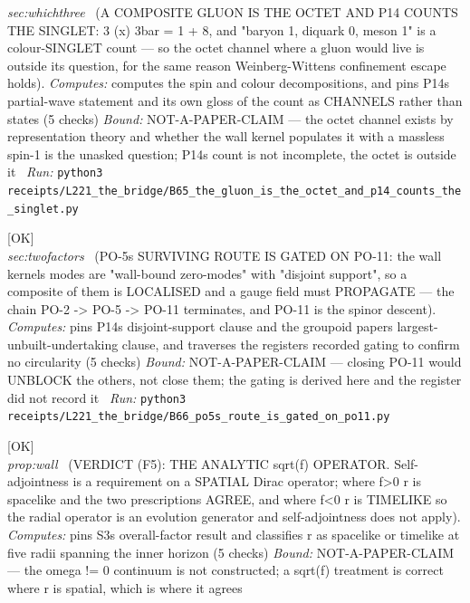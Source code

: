 \begin{description}
\textit{sec:whichthree} \ (A COMPOSITE GLUON IS THE OCTET AND P14 COUNTS THE SINGLET: 3 (x) 3bar = 1 + 8, and "baryon 1, diquark 0, meson 1" is a colour-SINGLET count --- so the octet channel where a gluon would live is outside its question, for the same reason Weinberg-Wittens confinement escape holds). 
\emph{Computes:} computes the spin and colour decompositions, and pins P14s partial-wave statement and its own gloss of the count as CHANNELS rather than states (5 checks)
 \emph{Bound:} NOT-A-PAPER-CLAIM --- the octet channel exists by representation theory and whether the wall kernel populates it with a massless spin-1 is the unasked question; P14s count is not incomplete, the octet is outside it
\ \emph{Run:} \texttt{python3 receipts/L221\_the\_bridge/B65\_the\_gluon\_is\_the\_octet\_and\_p14\_counts\_the\_singlet.py}
\item[\label{rcpt:B66_po5s_route_is_gated_on_po11}\texttt{B66\_po5s\_route\_is\_gated\_on\_po11}]\hfill\textsf{[OK]}\\
\textit{sec:twofactors} \ (PO-5s SURVIVING ROUTE IS GATED ON PO-11: the wall kernels modes are "wall-bound zero-modes" with "disjoint support", so a composite of them is LOCALISED and a gauge field must PROPAGATE --- the chain PO-2 -> PO-5 -> PO-11 terminates, and PO-11 is the spinor descent). 
\emph{Computes:} pins P14s disjoint-support clause and the groupoid papers largest-unbuilt-undertaking clause, and traverses the registers recorded gating to confirm no circularity (5 checks)
 \emph{Bound:} NOT-A-PAPER-CLAIM --- closing PO-11 would UNBLOCK the others, not close them; the gating is derived here and the register did not record it
\ \emph{Run:} \texttt{python3 receipts/L221\_the\_bridge/B66\_po5s\_route\_is\_gated\_on\_po11.py}
\item[\label{rcpt:B67_verdict_the_analytic_sqrt_f_operator}\texttt{B67\_verdict\_the\_analytic\_sqrt\_f\_operator}]\hfill\textsf{[OK]}\\
\textit{prop:wall} \ (VERDICT (F5): THE ANALYTIC sqrt(f) OPERATOR. Self-adjointness is a requirement on a SPATIAL Dirac operator; where f>0 r is spacelike and the two prescriptions AGREE, and where f<0 r is TIMELIKE so the radial operator is an evolution generator and self-adjointness does not apply). 
\emph{Computes:} pins S3s overall-factor result and classifies r as spacelike or timelike at five radii spanning the inner horizon (5 checks)
 \emph{Bound:} NOT-A-PAPER-CLAIM --- the omega != 0 continuum is not constructed; a sqrt(\textbar{}f\textbar{}) treatment is correct where r is spatial, which is where it agrees

\end{description}
